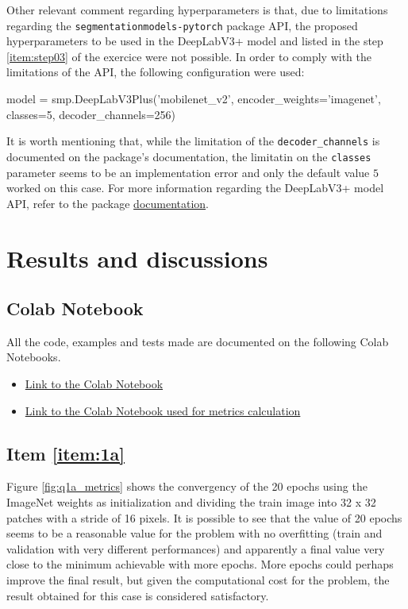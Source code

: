 \documentclass[10pt, a4paper]{article}
\begin{document}
Other relevant comment regarding hyperparameters is that, due to limitations regarding the {\tt segmentation\-models-pytorch} package API, the proposed hyperparameters
to be used in the DeepLabV3+ model and listed in the step \ref{item:step03} of the exercice were not possible. In order to comply with the limitations of the API,
the following configuration were used:

\begin{python}
model = smp.DeepLabV3Plus('mobilenet_v2', encoder_weights='imagenet', classes=5, decoder_channels=256)
\end{python}

It is worth mentioning that, while the limitation of the {\tt decoder\_channels} is documented on the package's documentation, the limitatin on the {\tt classes} 
parameter seems to be an implementation error and only the default value $5$ worked on this case. For more information regarding the DeepLabV3+ model API, refer
to the package \href{https://smp.readthedocs.io/en/latest/models.html#id9}{documentation}.

\newpage
\section{Results and discussions}

\subsection{Colab Notebook}

All the code, examples and tests made are documented on the following Colab Notebooks. 

\begin{itemize}
  \item \href{https://colab.research.google.com/drive/1CsJtybd_mc1ewyKjQQcVnqqpMvM5mJwv?usp=sharing}{Link to the Colab Notebook}
  \item \href{https://colab.research.google.com/drive/1BkBRiBi91MBf_vex8Zw54tjMMbIPAN75?usp=sharing}{Link to the Colab Notebook used for metrics calculation}
\end{itemize}
\subsection{Item \ref{item:1a}}

Figure \ref{fig:q1a_metrics} shows the convergency of the 20 epochs using the ImageNet weights as initialization and dividing the train image into 32 x 32 patches 
with a stride of 16 pixels. It is possible to see that the value of 20 epochs seems to be a reasonable value for the problem with no overfitting (train and validation
with very different performances) and apparently a final value very close to the minimum achievable with more epochs. More epochs could perhaps improve the final result,
but given the computational cost for the problem, the result obtained for this case is considered satisfactory.
\end{document}
